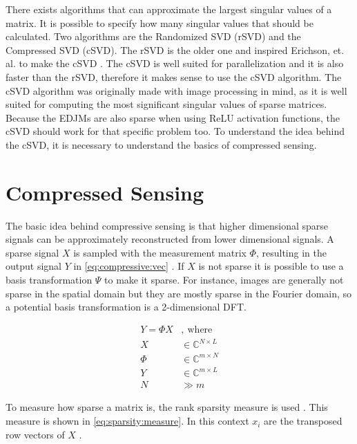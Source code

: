 There exists algorithms that can approximate the largest singular values of a matrix. It is possible to specify how many singular values that should be calculated. Two algorithms are the Randomized SVD (rSVD) and the Compressed SVD (cSVD). The rSVD is the older one and inspired Erichson, et. al. to make the cSVD \cite{erichson:csvd}. The cSVD is well suited for parallelization and it is also faster than the rSVD, therefore it makes sense to use the cSVD algorithm. The cSVD algorithm was originally made with image processing in mind, as it is well suited for computing the most significant singular values of sparse matrices. Because the EDJMs are also sparse when using ReLU activation functions, the cSVD should work for that specific problem too. To understand the idea behind the cSVD, it is necessary to understand the basics of compressed sensing.

\section{Compressed Sensing}

The basic idea behind compressive sensing is that higher dimensional sparse signals can be approximately reconstructed from lower dimensional signals. A sparse signal $X$ is sampled with the measurement matrix $\Phi$, resulting in the output signal $Y$ in \eqref{eq:compressive:vec} \cite{chen:mmv}. If $X$ is not sparse it is possible to use a basis transformation $\Psi$ to make it sparse. For instance, images are generally not sparse in the spatial domain but they are mostly sparse in the Fourier domain, so a potential basis transformation is a 2-dimensional DFT.

\begin{equation} \label{eq:compressive:vec}
\begin{split}
    Y = \Phi X &, \ \mathrm{where}      \\
    X &\in \mathbb{C}^{N \times L}      \\
    \Phi &\in \mathbb{C}^{m \times N}   \\
    Y &\in \mathbb{C}^{m \times L}      \\
    N &\gg m
\end{split}
\end{equation}

To measure how sparse a matrix is, the rank sparsity measure is used \cite{chen:mmv}. This measure is shown in \eqref{eq:sparsity:measure}. In this context $x_i$ are the transposed row vectors of $X$ .


